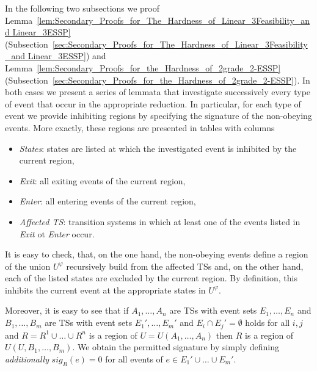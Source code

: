 \documentclass[english]{lipics_hacked}
\begin{document}
In the following two subsections we proof Lemma~\ref{lem:Secondary_Proofs_for_The_Hardness_of_Linear_3Feasibility_and Linear_3ESSP} (Subsection~\ref{sec:Secondary_Proofs_for_The_Hardness_of_Linear_3Feasibility_and Linear_3ESSP}) and Lemma~\ref{lem:Secondary_Proofs_for_the_Hardness_of_2grade_2-ESSP} (Subsection~\ref{sec:Secondary_Proofs_for_the_Hardness_of_2grade_2-ESSP}).
In both cases we present a series of lemmata that investigate successively every type of event that occur in the appropriate reduction.
In particular, for each type of event we provide inhibiting regions by specifying the signature of the non-obeying events.
More exactly, these regions are presented in tables with columns 
\begin{itemize}
	\item \textit{States}: states are listed at which the investigated event is inhibited by the current region, 
	\item \textit{Exit}: all exiting events of the current region,
	\item \textit{Enter}: all entering events of the current region,
	\item \textit{Affected TS}: transition systems in which at least one of the events listed in \textit{Exit} ot \textit{Enter} occur.
\end{itemize}
It is easy to check, that, on the one hand, the non-obeying events define a region of the union $U^\varphi$ recursively build from the affected TSs and, on the other hand, each of the listed states are excluded by the current region.
By definition, this inhibits the current event at the appropriate states in $U^\varphi$.

Moreover, it is easy to see that if $A_1,\ldots,A_n$ are TSs with event sets $E_1, \ldots, E_n$ and $B_1, \ldots, B_m$ are TSs with event sets $E_1',\ldots,E_m'$ and 
$E_i \cap E_j' = \emptyset$ holds for all $i,j$ and $R=R^{1}\cup \ldots \cup R^{n}$ is a region of $U=U(A_{1},\ldots,A_{n})$  then $R$ is a region of $U(U,B_1,\ldots,B_m)$.
We obtain the permitted signature by simply defining \textit{additionally} $sig_R(e)=0$ for all events of $e\in E_1'\cup \ldots \cup E_m'$.
\end{document}
